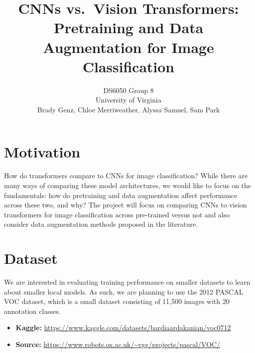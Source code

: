 \documentclass{article}
\title{CNNs vs.\ Vision Transformers: Pretraining and Data Augmentation for Image Classification}
\author{%
  DS6050 Group 8 \\
  University of Virginia \\
  Brady Genz, Chloe Merriweather, Alyssa Samuel, Sam Park \\
}
\begin{document}
\maketitle



\section{Motivation}

How do transformers compare to CNNs for image classification? While there are many ways of comparing these model architectures, we would like to focus on the fundamentals: how do pretraining and data augmentation affect performance across these two, and why? The project will focus on comparing CNNs to vision transformers for image classification across pre-trained versus not and also consider data augmentation methods proposed in the literature.


\section{Dataset}

We are interested in evaluating training performance on smaller datasets to learn about smaller local models. As such, we are planning to use the 2012 PASCAL VOC dataset, which is a small dataset consisting of 11,500 images with 20 annotation classes.

\begin{itemize}
    \item \textbf{Kaggle:} \url{https://www.kaggle.com/datasets/bardiaardakanian/voc0712}
    \item \textbf{Source:} \url{https://www.robots.ox.ac.uk/~vgg/projects/pascal/VOC/}
\end{itemize}
\end{document}
